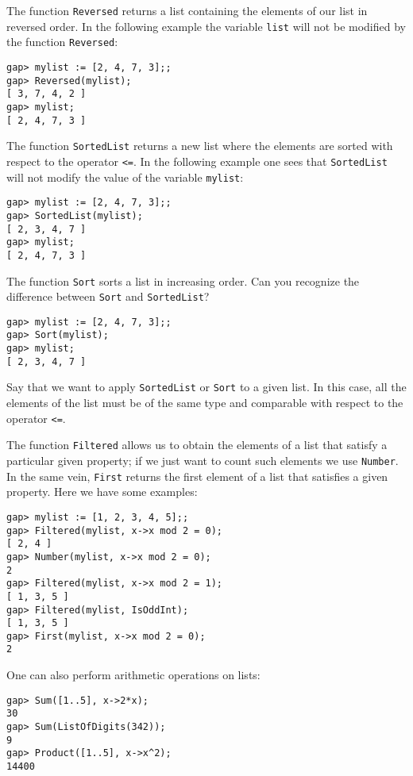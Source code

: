 The function \lstinline{Reversed} returns a list
containing the elements of our list in reversed order. 
In the following example 
the variable \lstinline{list} will not be modified by the function \lstinline{Reversed}:
\begin{lstlisting}
gap> mylist := [2, 4, 7, 3];;
gap> Reversed(mylist);
[ 3, 7, 4, 2 ]
gap> mylist;
[ 2, 4, 7, 3 ]
\end{lstlisting}
The function \lstinline{SortedList} returns a new list where the elements are sorted with
respect to the operator \lstinline{<=}. In the following example one sees that
\lstinline{SortedList} will not modify the value of the variable
\lstinline{mylist}:
\begin{lstlisting}
gap> mylist := [2, 4, 7, 3];;
gap> SortedList(mylist);
[ 2, 3, 4, 7 ]
gap> mylist;
[ 2, 4, 7, 3 ]
\end{lstlisting}
The function \lstinline{Sort} sorts a list in increasing order. Can you recognize the
difference between \lstinline{Sort} and \lstinline{SortedList}? 
\begin{lstlisting}
gap> mylist := [2, 4, 7, 3];;
gap> Sort(mylist);
gap> mylist;
[ 2, 3, 4, 7 ]
\end{lstlisting}

\begin{remark}
  Say that we want to apply \lstinline{SortedList} or \lstinline{Sort} to a
  given list. In this case, all the elements of the list must be of the same
  type and comparable with respect to the operator \lstinline{<=}. 
\end{remark}

The function \lstinline{Filtered} allows us to obtain the elements of a list that satisfy a particular given property; if we just want to 
count such elements we use \lstinline{Number}.
In the same vein, \lstinline{First}
returns the first element of a list 
that satisfies a given property. 
Here we have some examples:
\begin{lstlisting}
gap> mylist := [1, 2, 3, 4, 5];;
gap> Filtered(mylist, x->x mod 2 = 0);
[ 2, 4 ]
gap> Number(mylist, x->x mod 2 = 0);
2
gap> Filtered(mylist, x->x mod 2 = 1);
[ 1, 3, 5 ]
gap> Filtered(mylist, IsOddInt);
[ 1, 3, 5 ]
gap> First(mylist, x->x mod 2 = 0);
2
\end{lstlisting}
One can also perform arithmetic operations on lists:
\begin{lstlisting}
gap> Sum([1..5], x->2*x);
30
gap> Sum(ListOfDigits(342));
9
gap> Product([1..5], x->x^2);
14400
\end{lstlisting}

